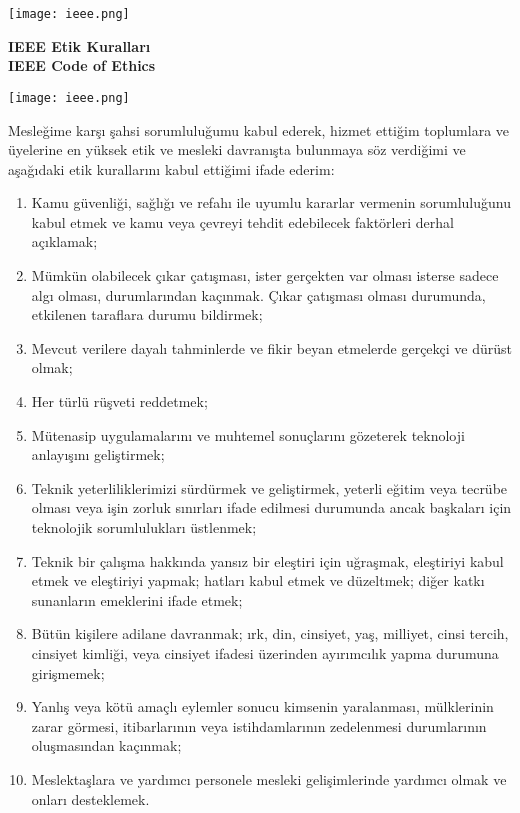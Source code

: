 \documentclass[a4paper, 12pt]{article}
\begin{document}
\begin{center}
{}


{\centering
\texttt{[image: ieee.png]}
\hfill
\begin{minipage}[b]{.6\textwidth}
\centering
\textbf{\LARGE IEEE Etik Kuralları\\\vspace{0.2cm}\hspace{0.3cm}IEEE Code of Ethics
}\vspace{0.7cm}
\end{minipage}
\hfill
\texttt{[image: ieee.png]}}
\vspace{1cm}
\end{center}

\small
Mesleğime karşı şahsi sorumluluğumu kabul ederek, hizmet ettiğim toplumlara ve üyelerine en yüksek etik ve mesleki davranışta bulunmaya söz verdiğimi ve aşağıdaki etik kurallarını kabul ettiğimi ifade ederim:
\begin{enumerate}
\itemsep0em 
\item Kamu güvenliği, sağlığı ve refahı ile uyumlu kararlar vermenin sorumluluğunu kabul etmek ve kamu veya çevreyi tehdit edebilecek faktörleri derhal açıklamak;
\item Mümkün olabilecek çıkar çatışması, ister gerçekten var olması isterse sadece algı olması, durumlarından kaçınmak. Çıkar çatışması olması durumunda, etkilenen taraflara durumu bildirmek;
\item Mevcut verilere dayalı tahminlerde ve fikir beyan etmelerde gerçekçi ve dürüst olmak;
\item Her türlü rüşveti reddetmek;
\item Mütenasip uygulamalarını ve muhtemel sonuçlarını gözeterek teknoloji anlayışını geliştirmek;
\item	Teknik yeterliliklerimizi sürdürmek ve geliştirmek, yeterli eğitim veya tecrübe olması veya işin zorluk sınırları ifade edilmesi durumunda ancak başkaları için teknolojik sorumlulukları üstlenmek;
\item	Teknik bir çalışma hakkında yansız bir eleştiri için uğraşmak, eleştiriyi kabul etmek ve eleştiriyi yapmak; hatları kabul etmek ve düzeltmek; diğer katkı sunanların emeklerini ifade etmek;
\item	Bütün kişilere adilane davranmak; ırk, din, cinsiyet, yaş, milliyet, cinsi tercih, cinsiyet kimliği, veya cinsiyet ifadesi üzerinden ayırımcılık yapma durumuna girişmemek;
\item	Yanlış veya kötü amaçlı eylemler sonucu kimsenin yaralanması, mülklerinin zarar görmesi, itibarlarının veya istihdamlarının zedelenmesi durumlarının oluşmasından kaçınmak;
\item	Meslektaşlara ve yardımcı personele mesleki gelişimlerinde yardımcı olmak ve onları desteklemek.

\end{enumerate}
\end{document}

